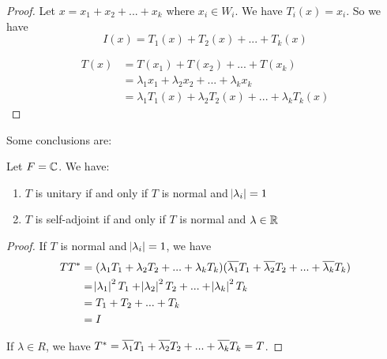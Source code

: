 \begin{proof}
    Let $x = x_1 + x_2 + ... + x_k$ where $x_i \in W_i$. We have $T_i (x) = x_i$. So we have
    \begin{equation*}
        I(x) = T_1 (x) + T_2 (x) + ... + T_k (x)
    \end{equation*}
   
    \begin{equation*}
        \begin{aligned}
            T(x) &= T(x_1) + T(x_2) + ... + T(x_k) \\
            &= \lambda_1 x_1 + \lambda_2 x_2 + ... + \lambda_k x_k \\
            &= \lambda_1 T_1 (x) + \lambda_2 T_2 (x) + ... + \lambda_k T_k (x)
        \end{aligned}        
    \end{equation*}
\end{proof}


Some conclusions are:
\begin{theorem}
    Let $F = \mathbb{C}$. We have:
    \begin{enumerate}
        \item $T$ is unitary if and only if $T$ is normal and $\abs{\lambda_i} = 1$
        \item $T$ is self-adjoint if and only if $T$ is normal and $\lambda \in \mathbb{R}$
    \end{enumerate}    
\end{theorem}
\begin{proof}
    If $T$ is normal and $\abs{\lambda_i} = 1$, we have 
    \begin{equation*}
        \begin{aligned}
            TT^* &= (\lambda_1 T_1 + \lambda_2 T_2 + ... + \lambda_k T_k) (\overline{\lambda_1} T_1 + \overline{\lambda_2} T_2 + ... + \overline{\lambda_k} T_k) \\
            &= \abs{\lambda_1}^2 T_1 + \abs{\lambda_2}^2 T_2 + ... + \abs{\lambda_k}^2 T_k \\
            &= T_1 + T_2 + ... + T_k \\
            &= I
        \end{aligned}        
    \end{equation*}
    
    If $\lambda \in R$, we have $T^* = \overline{\lambda_1} T_1 + \overline{\lambda_2} T_2 + ... + \overline{\lambda_k} T_k = T$.
\end{proof}



